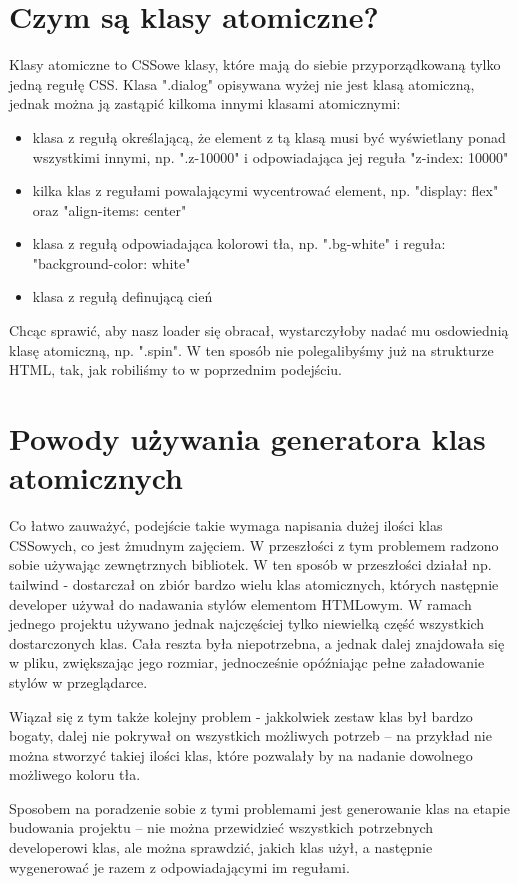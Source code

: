 \documentclass{SGGW-thesis}
\begin{document}
\section{Czym są klasy atomiczne?}
Klasy atomiczne to CSSowe klasy, które mają do siebie przyporządkowaną tylko jedną regułę CSS. Klasa ".dialog" opisywana wyżej nie jest klasą atomiczną, jednak można ją zastąpić kilkoma innymi klasami atomicznymi:
\begin{itemize}
    \item klasa z regułą określającą, że element z tą klasą musi być wyświetlany ponad wszystkimi innymi, np. ".z-10000" i odpowiadająca jej reguła "z-index: 10000"
    \item kilka klas z regułami powalającymi wycentrować element, np. "display: flex" oraz "align-items: center"
    \item klasa z regułą odpowiadająca kolorowi tła, np. ".bg-white" i reguła: "background-color: white"
    \item klasa z regułą definującą cień
\end{itemize}

Chcąc sprawić, aby nasz loader się obracał, wystarczyłoby nadać mu osdowiednią klasę atomiczną, np. ".spin". W ten sposób nie polegalibyśmy już na strukturze HTML, tak, jak robiliśmy to w poprzednim podejściu.


\section{Powody używania generatora klas atomicznych}
Co łatwo zauważyć, podejście takie wymaga napisania dużej ilości klas CSSowych, co jest żmudnym zajęciem. W przeszłości z tym problemem radzono sobie używając zewnętrznych bibliotek. W ten sposób w przeszłości działał np. tailwind - dostarczał on zbiór bardzo wielu klas atomicznych, których następnie developer używał do nadawania stylów elementom HTMLowym. W ramach jednego projektu używano jednak najczęściej tylko niewielką część wszystkich dostarczonych klas. Cała reszta była niepotrzebna, a jednak dalej znajdowała się w pliku, zwiększając jego rozmiar, jednocześnie opóźniając pełne załadowanie stylów w przeglądarce.

Wiązał się z tym także kolejny problem - jakkolwiek zestaw klas był bardzo bogaty, dalej nie pokrywał on wszystkich możliwych potrzeb -- na przykład nie można stworzyć takiej ilości klas, które pozwalały by na nadanie dowolnego możliwego koloru tła.

Sposobem na poradzenie sobie z tymi problemami jest generowanie klas na etapie budowania projektu -- nie można przewidzieć wszystkich potrzebnych developerowi klas, ale można sprawdzić, jakich klas użył, a następnie wygenerować je razem z odpowiadającymi im regułami.
\end{document}
